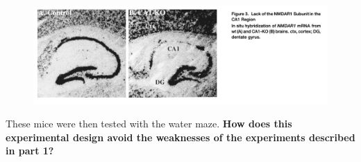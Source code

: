 \documentclass{article}
\begin{document}
\FloatBarrier
\begin{figure}[h]
  \centering
    \includegraphics[width=.99\textwidth]{fig3.png}
\end{figure}
\FloatBarrier

These mice were then tested with the water maze.
\textbf{How does this experimental design avoid the weaknesses of the experiments described in part 1?}

\vspace{2cm}

\pagebreak
\end{document}
